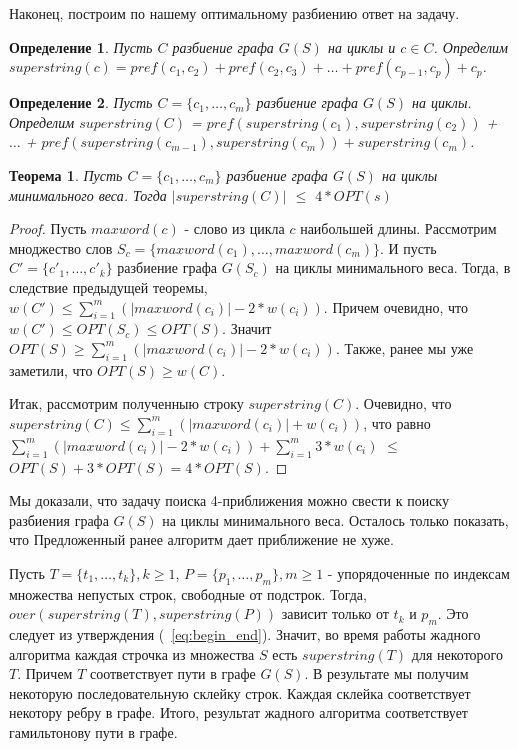 \documentclass[a4paper,10pt]{article}
\newtheorem{theorem}{Теорема}
\newtheorem{definition}{Определение}
\begin{document}
\noindent Наконец, построим по нашему оптимальному разбиению ответ на задачу.

\begin{definition}
Пусть $C$ разбиение графа $G(S)$ на циклы и $c \in C$.
Определим $superstring(c) = pref( c_1, c_2 ) + pref( c_2, c_3 ) + \dots + pref( c_{p-1}, c_p ) + c_p$.
\end{definition}

\begin{definition}
Пусть $C = \{c_1, \dots, c_m\}$ разбиение графа $G(S)$ на циклы.
Определим $superstring(C)$ = $pref( superstring(c_1), superstring(c_2) )$ + $\dots$ + $pref( superstring(c_{m-1}), superstring(c_m) ) + superstring(c_m)$.
\end{definition}

\begin{theorem}
Пусть $C = \{c_1, \dots, c_m\}$ разбиение графа $G(S)$ на циклы минимального веса. Тогда $|superstring(C)|$ $\leq$ $4*OPT(s)$
\end{theorem}

\begin{proof}
Пусть $maxword(c)$ - слово из цикла $c$ наибольшей длины.
Рассмотрим мноджество слов $S_c = \{ maxword(c_1), \dots, maxword(c_m) \}$.
И пусть $C' = \{c'_1, \dots, c'_k\}$ разбиение графа $G(S_c)$ на циклы минимального веса.
Тогда, в следствие предыдущей теоремы, $w(C') \leq \sum\limits_{i=1}^m ( |maxword(c_i)| - 2 * w(c_i) )$.
Причем очевидно, что $w(C') \leq OPT(S_c) \leq OPT(S)$. Значит $OPT(S) \geq \sum\limits_{i=1}^m ( |maxword(c_i)| - 2 * w(c_i) )$.
Также, ранее мы уже заметили, что $OPT(S) \geq w(C)$.

Итак, рассмотрим полученныю строку $superstring(C)$. Очевидно, что $superstring(C) \leq \sum\limits_{i=1}^m ( |maxword(c_i)| + w(c_i) )$, 
что равно $\sum\limits_{i=1}^m ( |maxword(c_i)| - 2 * w(c_i) ) + \sum\limits_{i=1}^m 3 * w(c_i)$ $\leq$ $OPT(S) + 3 * OPT(S) = 4 * OPT(S)$.
\end{proof}

Мы доказали, что задачу поиска 4-приближения можно свести к поиску разбиения графа $G(S)$ на циклы минимального веса.
Осталось только показать, что Предложенный ранее алгоритм дает приближение не хуже.

Пусть $T = \{t_1,\dots,t_k\}, k \geq 1$, $P = \{p_1,\dots,p_m\}, m \geq 1$ - упорядоченные по индексам множества непустых строк, свободные от подстрок.
Тогда, $over( superstring(T), superstring(P) )$ зависит только от $t_k$ и $p_m$.
Это следует из утверждения (~\ref{eq:begin_end}).
Значит, во время работы жадного алгоритма каждая строчка из множества $S$ есть $superstring(T)$ для некоторого $T$.
Причем $T$ соответствует пути в графе $G(S)$.
В результате мы получим некоторую последовательную склейку строк. Каждая склейка соответствует некотору ребру в графе.
Итого, результат жадного алгоритма соответствует гамильтонову пути в графе.
\end{document}
